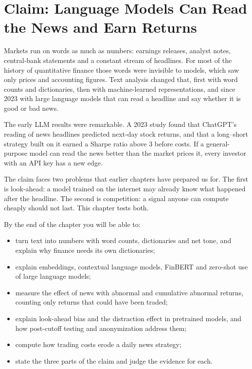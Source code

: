 \makeatletter
{}
\makeatother

\chapter{Claim: Language Models Can Read the News and Earn Returns}
\label{ch:23}

Markets run on words as much as numbers: earnings releases, analyst notes, central-bank statements and a constant stream of headlines. For most of the history of quantitative finance those words were invisible to models, which saw only prices and accounting figures. Text analysis changed that, first with word counts and dictionaries, then with machine-learned representations, and since 2023 with large language models that can read a headline and say whether it is good or bad news.

The early LLM results were remarkable. A 2023 study found that ChatGPT's reading of news headlines predicted next-day stock returns, and that a long--short strategy built on it earned a Sharpe ratio above 3 before costs. If a general-purpose model can read the news better than the market prices it, every investor with an API key has a new edge.

The claim faces two problems that earlier chapters have prepared us for. The first is look-ahead: a model trained on the internet may already know what happened after the headline. The second is competition: a signal anyone can compute cheaply should not last. This chapter tests both.

By the end of the chapter you will be able to:

\begin{itemize}
  \item turn text into numbers with word counts, dictionaries and net tone, and explain why finance needs its own dictionaries;
  \item explain embeddings, contextual language models, FinBERT and zero-shot use of large language models;
  \item measure the effect of news with abnormal and cumulative abnormal returns, counting only returns that could have been traded;
  \item explain look-ahead bias and the distraction effect in pretrained models, and how post-cutoff testing and anonymization address them;
  \item compute how trading costs erode a daily news strategy;
  \item state the three parts of the claim and judge the evidence for each.
\end{itemize}


